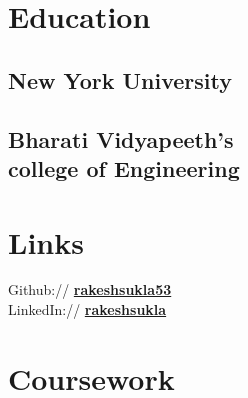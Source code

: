 \documentclass[letterpaper]{deedy-resume} %
\begin{document}
\begin{minipage}[t]{0.33\textwidth} %


\section{Education} 

\subsection{New York University}


\sectionspace %
\subsection[Bharati Vidyapeeth's  college of Engineering]{\texorpdfstring{Bharati Vidyapeeth's\\ college of Engineering}{}}

\sectionspace %


\section{Links} 

Github:// \href{https://github.com/rakeshsukla53}{\bf rakeshsukla53} \\
LinkedIn:// \href{https://www.linkedin.com/in/rakeshsukla}{\bf rakeshsukla}

\sectionspace %


\section{Coursework}


\end{minipage}
\end{document}
